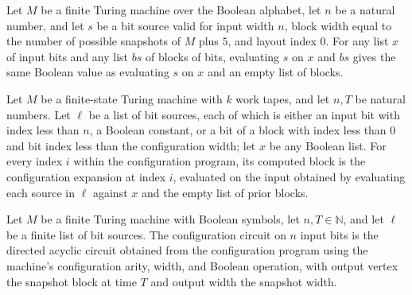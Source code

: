 \begin{theorem}
\label{Complexity.eval_layout}
\leanok
{}
Let $M$ be a finite Turing machine over the Boolean alphabet, let $n$ be a natural
number, and let $s$ be a bit source valid for input width $n$, block width equal to the
number of possible snapshots of $M$ plus $5$, and layout index $0$. For any list $x$ of
input bits and any list $bs$ of blocks of bits, evaluating $s$ on $x$ and $bs$ gives the
same Boolean value as evaluating $s$ on $x$ and an empty list of blocks.
\end{theorem}

\begin{theorem}
\label{Complexity.cfgProg_blocks}
\leanok
{}
Let $M$ be a finite-state Turing machine with $k$ work tapes, and let $n,T$ be natural
numbers. Let $\ell$ be a list of bit sources, each of which is either an input bit with
index less than $n$, a Boolean constant, or a bit of a block with index less than $0$
and bit index less than the configuration width; let $x$ be any Boolean list. For every
index $i$ within the configuration program, its computed block is the configuration
expansion at index $i$, evaluated on the input obtained by evaluating each source in
$\ell$ against $x$ and the empty list of prior blocks.
\end{theorem}

\begin{definition}
\label{Complexity.cfgCircuit}
\leanok
{}
Let $M$ be a finite Turing machine with Boolean symbols, let $n,T\in\mathbb{N}$, and let
$\ell$ be a finite list of bit sources. The configuration circuit on $n$ input bits is
the directed acyclic circuit obtained from the configuration program using the machine's
configuration arity, width, and Boolean operation, with output vertex the snapshot block
at time $T$ and output width the snapshot width.
\end{definition}

